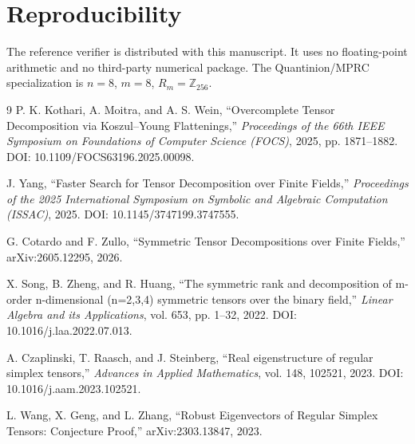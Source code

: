 \documentclass[11pt]{article}
\theoremstyle{definition}
\newcommand{\Z}{\mathbb{Z}}
\begin{document}
\section*{Reproducibility}
The reference verifier is distributed with this manuscript. It uses no floating-point arithmetic and no third-party numerical package. The Quantinion/MPRC specialization is $n=8$, $m=8$, $R_m=\Z_{256}$.

\begin{thebibliography}{9}
P. K. Kothari, A. Moitra, and A. S. Wein,
``Overcomplete Tensor Decomposition via Koszul--Young Flattenings,''
\emph{Proceedings of the 66th IEEE Symposium on Foundations of Computer Science (FOCS)}, 2025, pp. 1871--1882.
DOI: 10.1109/FOCS63196.2025.00098.

J. Yang,
``Faster Search for Tensor Decomposition over Finite Fields,''
\emph{Proceedings of the 2025 International Symposium on Symbolic and Algebraic Computation (ISSAC)}, 2025.
DOI: 10.1145/3747199.3747555.

G. Cotardo and F. Zullo,
``Symmetric Tensor Decompositions over Finite Fields,''
arXiv:2605.12295, 2026.

X. Song, B. Zheng, and R. Huang,
``The symmetric rank and decomposition of m-order n-dimensional (n=2,3,4) symmetric tensors over the binary field,''
\emph{Linear Algebra and its Applications}, vol. 653, pp. 1--32, 2022.
DOI: 10.1016/j.laa.2022.07.013.

A. Czaplinski, T. Raasch, and J. Steinberg,
``Real eigenstructure of regular simplex tensors,''
\emph{Advances in Applied Mathematics}, vol. 148, 102521, 2023.
DOI: 10.1016/j.aam.2023.102521.

L. Wang, X. Geng, and L. Zhang,
``Robust Eigenvectors of Regular Simplex Tensors: Conjecture Proof,''
arXiv:2303.13847, 2023.
\end{thebibliography}
\end{document}
